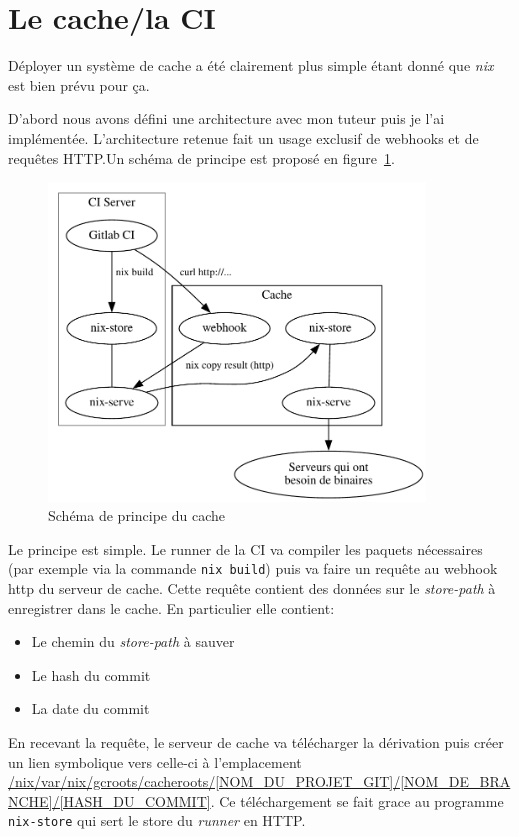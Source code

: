 \documentclass[a4paper,12pt]{article}
\begin{document}
\section{Le cache/la CI}

Déployer un système de cache a été clairement plus simple étant donné que \emph{nix}
est bien prévu pour ça.

D'abord nous avons défini une architecture avec mon tuteur puis je l'ai
implémentée. L'architecture retenue fait un usage exclusif de webhooks et de
requêtes HTTP.\@ Un schéma de principe est proposé en figure~\ref{fig:ci}.

\begin{figure}[h!]
	\centering
	\includegraphics[width=10cm]{./media/ci.pdf}
	\caption{Schéma de principe du cache}\label{fig:ci}
\end{figure}

Le principe est simple. Le runner de la CI va compiler les paquets nécessaires
(par exemple via la commande \texttt{nix build}) puis va faire un requête au webhook
http du serveur de cache. Cette requête contient des données sur le
\emph{store-path} à enregistrer dans le cache. En particulier elle contient:
\begin{itemize}
	\item Le chemin du \emph{store-path} à sauver
	\item Le hash du commit
	\item La date du commit
\end{itemize}

En recevant la requête, le serveur de cache va télécharger la dérivation puis
créer un lien symbolique vers celle-ci à l'emplacement
\url{/nix/var/nix/gcroots/cacheroots/[NOM\_DU\_PROJET\_GIT]/[NOM\_DE\_BRANCHE]/[HASH\_DU\_COMMIT]}.
Ce téléchargement se fait grace au programme \texttt{nix-store} qui sert le
store du \emph{runner} en HTTP.\@
\end{document}
